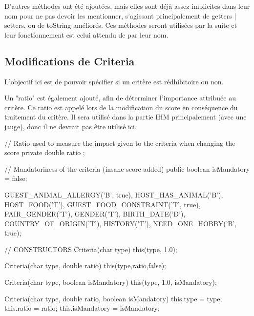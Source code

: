 \documentclass{mytex}
\begin{document}

D'autres méthodes ont été ajoutées, mais elles sont déjà assez implicites dans leur nom pour ne pas devoir les mentionner, s'agissant principalement de getters | setters, ou de toString améliorés. Ces méthodes seront utilisées par la suite et leur fonctionnement est celui attendu de par leur nom.

\subsection{Modifications de Criteria}

L'objectif ici est de pouvoir spécifier si un critère est rédhibitoire ou non.

Un "ratio" est également ajouté, afin de déterminer l'importance attribuée au critère. Ce ratio est appelé lors de la modification du score en conséquence du traitement du critère. Il sera utilisé dans la partie IHM principalement (avec une jauge), donc il ne devrait pas être utilisé ici.


\begin{codebox}
// Ratio used to measure the impact given to the criteria when changing the score
private double ratio ;

// Mandatoriness of the criteria (insane score added)
public boolean isMandatory = false; 
\end{codebox}


\begin{codebox}
GUEST_ANIMAL_ALLERGY('B', true),
HOST_HAS_ANIMAL('B'),
HOST_FOOD('T'),
GUEST_FOOD_CONSTRAINT('T', true),
PAIR_GENDER('T'),
GENDER('T'),
BIRTH_DATE('D'),
COUNTRY_OF_ORIGIN('T'),
HISTORY('T'),
NEED_ONE_HOBBY('B', true);
\end{codebox}


\begin{codebox}
// CONSTRUCTORS
Criteria(char type) {
	this(type, 1.0);
}

Criteria(char type, double ratio) {
	this(type,ratio,false);
}

Criteria(char type, boolean isMandatory) {
	this(type, 1.0, isMandatory);
}

Criteria(char type, double ratio, boolean isMandatory) {
	this.type = type;
	this.ratio = ratio;
	this.isMandatory = isMandatory;
}
\end{codebox}
\end{document}
